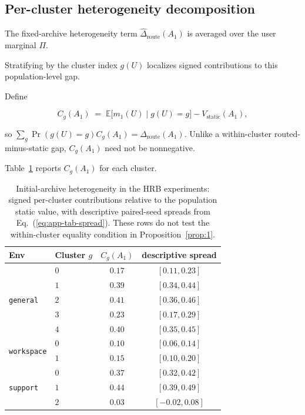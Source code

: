 \documentclass{article} %
\renewcommand{\eqref}[1]{\textup{(\ref{#1})}}
\begin{document}
\subsection{Per-cluster heterogeneity decomposition}

\label{app:tab-cluster}

The fixed-archive heterogeneity term $\widehat\Delta_{\mathrm{route}}(A_1)$ is averaged over the user marginal $\Pi$.

Stratifying by the cluster index \(g(U)\) localizes signed contributions to
this population-level gap.

Define

\begin{equation}
\label{eq:app-tab-clustergap}
C_g(A_1)
\;=\;
\mathbb{E}\big[m_1(U)\mid g(U)=g\big]
- V_{\mathrm{static}}(A_1),
\end{equation}

so \(\sum_g\Pr(g(U)=g)C_g(A_1)=\Delta_{\mathrm{route}}(A_1)\).
Unlike a within-cluster routed-minus-static gap, \(C_g(A_1)\) need not be
nonnegative.

Table~\ref{tab:app-cluster} reports \(C_g(A_1)\) for each cluster.

\begin{table}[h]
\centering
\small
\begin{tabular}{llcc}
\toprule
Env & Cluster $g$ & $C_g(A_1)$ & descriptive spread \\
\midrule
\multirow{5}{*}{\texttt{general}}
 & $0$ & $0.17$ & $[0.11, 0.23]$ \\
 & $1$ & $0.39$ & $[0.34, 0.44]$ \\
 & $2$ & $0.41$ & $[0.36, 0.46]$ \\
 & $3$ & $0.23$ & $[0.17, 0.29]$ \\
 & $4$ & $0.40$ & $[0.35, 0.45]$ \\
\midrule
\multirow{2}{*}{\texttt{workspace}}
 & $0$ & $0.10$ & $[0.06, 0.14]$ \\
 & $1$ & $0.15$ & $[0.10, 0.20]$ \\
\midrule
\multirow{3}{*}{\texttt{support}}
 & $0$ & $0.37$ & $[0.32, 0.42]$ \\
 & $1$ & $0.44$ & $[0.39, 0.49]$ \\
 & $2$ & $0.03$ & $[-0.02, 0.08]$ \\
\bottomrule
\end{tabular}
\caption{Initial-archive heterogeneity in the HRB experiments: signed
per-cluster contributions relative to the population static value, with descriptive paired-seed spreads from
Eq.~\eqref{eq:app-tab-spread}.
These rows do not test the within-cluster equality condition in
Proposition~\ref{prop:1}.}
\label{tab:app-cluster}
\end{table}
\end{document}
